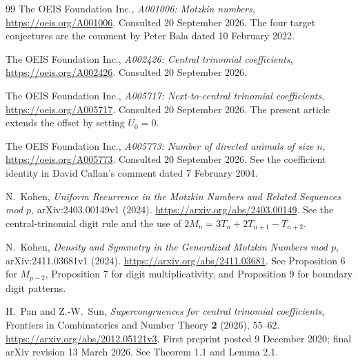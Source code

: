 \documentclass[11pt,a4paper]{article}
\numberwithin{equation}{section}
\theoremstyle{definition}
\theoremstyle{remark}
\begin{document}
\clearpage
{}
{}
\begin{thebibliography}{99}
The OEIS Foundation Inc., \emph{A001006: Motzkin numbers},
\url{https://oeis.org/A001006}. Consulted 20 September 2026.
The four target conjectures are the comment by Peter Bala dated
10 February 2022.

The OEIS Foundation Inc., \emph{A002426: Central trinomial coefficients},
\url{https://oeis.org/A002426}. Consulted 20 September 2026.

The OEIS Foundation Inc., \emph{A005717: Next-to-central trinomial
coefficients}, \url{https://oeis.org/A005717}.
Consulted 20 September 2026. The present article extends the offset by
setting $U_0=0$.

The OEIS Foundation Inc., \emph{A005773: Number of directed animals of
size $n$}, \url{https://oeis.org/A005773}.
Consulted 20 September 2026. See the coefficient identity in David
Callan's comment dated 7 February 2004.

N.~Kohen, \emph{Uniform Recurrence in the Motzkin Numbers and Related
Sequences mod $p$}, arXiv:2403.00149v1 (2024).
\url{https://arxiv.org/abs/2403.00149}.
See the central-trinomial digit rule and the use of
$2M_n=3T_n+2T_{n+1}-T_{n+2}$.

N.~Kohen, \emph{Density and Symmetry in the Generalized Motzkin Numbers
mod $p$}, arXiv:2411.03681v1 (2024).
\url{https://arxiv.org/abs/2411.03681}.
See Proposition 6 for $M_{p-2}$, Proposition 7 for digit
multiplicativity, and Proposition 9 for boundary digit patterns.

H.~Pan and Z.-W.~Sun, \emph{Supercongruences for central trinomial
coefficients}, Frontiers in Combinatorics and Number Theory
\textbf{2} (2026), 55--62.
\url{https://arxiv.org/abs/2012.05121v3}.
First preprint posted 9 December 2020; final arXiv revision
13 March 2026. See Theorem 1.1 and Lemma 2.1.
\end{thebibliography}
\end{document}
